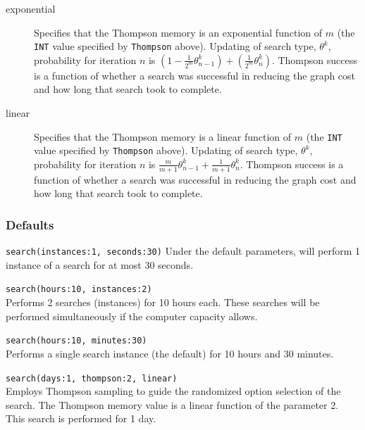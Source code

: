 \begin{description}
		\begin{description}
		
			\item[exponential] Specifies that the Thompson memory is an exponential function of 
			$m$ (the \texttt{INT} value specified by \texttt{Thompson} above). Updating of search 
			type, $\theta^k$, probability for iteration $n$ is $ \left(1 - \frac{1}{2^m} \theta^k_{n-1}\right) 
			+ \left(\frac{1}{2^m} \theta^k_n \right)$. Thompson success is a function of whether a 
			search was successful in reducing the graph cost and how long that search took to 
			complete.
			
			\item[linear] Specifies that the Thompson memory is a linear function of $m$ (the 
			\texttt{INT} value specified by \texttt{Thompson} above). Updating of search type, $\theta^k$, 
			probability for iteration $n$ is $\frac{m}{m+1} \theta^k_{n-1} + \frac{1}{m+1} \theta^k_n$.  
			Thompson success is a function of whether a search was successful in reducing the graph 
			cost and how long that search took to complete.

		\end{description}
		
	\end{description}		
	
	\subsubsection{Defaults}
		\texttt{search(instances:1, seconds:30)} Under the default parameters, \phyg will perform 1 
		instance of a search for at most 30 seconds.
		
	\begin{example}
	
		\item{\texttt{search(hours:10, instances:2)}\\ Performs 2 searches (instances) for 10 hours 
		each. These searches will be performed simultaneously if the computer capacity allows.}
				
		\item{\texttt{search(hours:10, minutes:30)}\\ Performs a single search instance (the default) 
		for 10 hours and 30 minutes.}
		
		\item{\texttt{search(days:1, thompson:2, linear)}\\ Employs Thompson sampling to guide the 
		randomized option selection of the search. The Thompson memory value is a linear function 
		of the parameter 2. This search is performed for 1 day.}
		
	\end{example}
	
